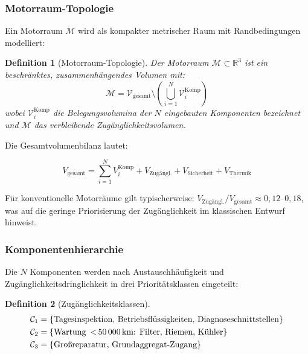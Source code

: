 ﻿\documentclass[12pt,a4paper]{article}
\newtheorem{definition}{Definition}[section]
\begin{document}
\subsubsection{Motorraum-Topologie}

Ein Motorraum $\mathcal{M}$ wird als kompakter metrischer Raum mit Randbedingungen
modelliert:

\begin{definition}[Motorraum-Topologie]
	Der Motorraum $\mathcal{M} \subset \mathbb{R}^3$ ist ein beschränktes,
	zusammenhängendes Volumen mit:
	\begin{equation}
		\mathcal{M} = \mathcal{V}_\mathrm{gesamt} \setminus
		\left(\bigcup_{i=1}^{N} \mathcal{V}_i^\mathrm{Komp}\right)
		\label{eq:motorraum_top}
	\end{equation}
	wobei $\mathcal{V}_i^\mathrm{Komp}$ die Belegungsvolumina der $N$ eingebauten
	Komponenten bezeichnet und $\mathcal{M}$ das verbleibende Zugänglichkeitsvolumen.
\end{definition}

Die Gesamtvolumenbilanz lautet:

\begin{equation}
	V_\mathrm{gesamt} = \sum_{i=1}^{N} V_i^\mathrm{Komp} + V_\mathrm{Zugängl.}
	+ V_\mathrm{Sicherheit} + V_\mathrm{Thermik}
	\label{eq:volumenbilanz}
\end{equation}

Für konventionelle Motorräume gilt typischerweise:
$V_\mathrm{Zugängl.}/V_\mathrm{gesamt} \approx 0{,}12\text{--}0{,}18$,
was auf die geringe Priorisierung der Zugänglichkeit im klassischen Entwurf
hinweist.

\subsubsection{Komponentenhierarchie}

Die $N$ Komponenten werden nach Austauschhäufigkeit und Zugänglichkeitsdringlichkeit
in drei Prioritätsklassen eingeteilt:

\begin{definition}[Zugänglichkeitsklassen]
	\begin{align}
		\mathcal{C}_1 &= \{\text{Tagesinspektion, Betriebsflüssigkeiten, Diagnoseschnittstellen}\}
		\label{eq:klasse1} \\
		\mathcal{C}_2 &= \{\text{Wartung \,<\,50\,000\,km: Filter, Riemen, Kühler}\}
		\label{eq:klasse2} \\
		\mathcal{C}_3 &= \{\text{Großreparatur, Grundaggregat-Zugang}\}
		\label{eq:klasse3}
	\end{align}
\end{definition}
\end{document}
